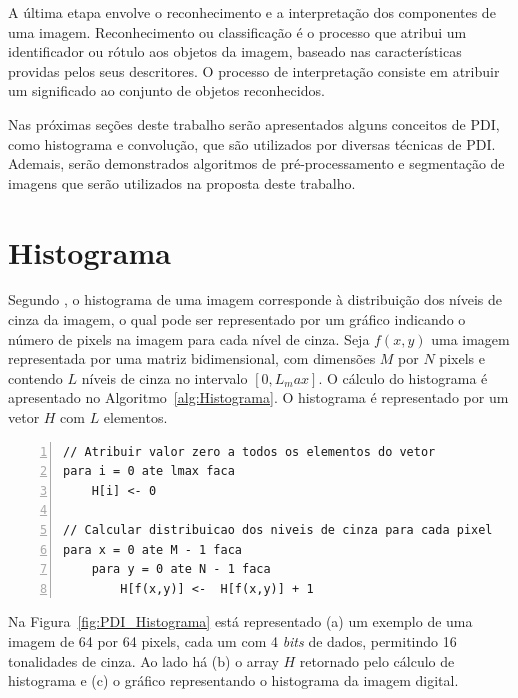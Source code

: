 \documentclass[12pt,oneside,a4paper,english,french,spanish,brazil,]{abntex2}
\begin{document}
A última etapa envolve o reconhecimento e a interpretação dos componentes de uma imagem. Reconhecimento ou classificação é o processo que atribui um identificador ou rótulo aos objetos da imagem, baseado nas características providas pelos seus descritores. O processo de interpretação consiste em atribuir um significado ao conjunto de objetos reconhecidos.

Nas próximas seções deste trabalho serão apresentados alguns conceitos de PDI, como histograma e convolução, que são utilizados por diversas técnicas de PDI. Ademais, serão demonstrados algoritmos de pré-processamento e segmentação de imagens que serão utilizados na proposta deste trabalho.

\section{Histograma}

Segundo \citet{pedrini:2008}, o histograma de uma imagem corresponde à distribuição dos níveis de cinza da imagem, o qual pode ser representado por um gráfico indicando o número de pixels na imagem para cada nível de cinza. Seja \(f(x,y)\) uma imagem representada por uma matriz bidimensional, com dimensões \(M\) por \(N\) pixels e contendo \(L\) níveis de cinza no intervalo \([0, L_max]\). O cálculo do histograma é apresentado no Algoritmo~\ref{alg:Histograma}. O histograma é representado por um vetor \(H\) com \(L\) elementos.

\begin{lstlisting}[caption={Cálculo do histograma de uma imagem em tons de cinza}, label=alg:Histograma, numbers=left]
// Atribuir valor zero a todos os elementos do vetor
para i = 0 ate lmax faca
    H[i] <- 0
    
// Calcular distribuicao dos niveis de cinza para cada pixel
para x = 0 ate M - 1 faca
    para y = 0 ate N - 1 faca
        H[f(x,y)] <-  H[f(x,y)] + 1
\end{lstlisting}

Na Figura~\ref{fig:PDI_Histograma} está representado (a) um exemplo de uma imagem de 64 por 64 pixels, cada um com 4 \textit{bits} de dados, permitindo 16 tonalidades de cinza. Ao lado há (b) o array \(H\) retornado pelo cálculo de histograma e (c) o gráfico representando o histograma da imagem digital.
\end{document}
